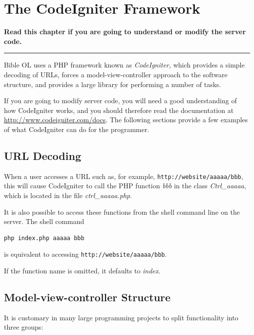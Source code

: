 \documentclass[11pt,oneside,a4paper]{memoir}
\begin{document}
\chapter{The CodeIgniter Framework}\label{chap-codeigniter-use}

\textbf{Read this chapter if you are going to understand or modify the server code.}
\plainbreak{3}

Bible OL uses a PHP framework known as \emph{CodeIgniter,} which provides a simple decoding of URLs,
forces a model-view-controller approach to the software structure, and provides a large library for
performing a number of tasks.

If you are going to modify server code, you will need a good understanding of how CodeIgniter works,
and you should therefore read the documentation at \url{http://www.codeigniter.com/docs}.
The following sections provide a few examples of what CodeIgniter can do for the programmer.

\section{URL Decoding}
\label{url-decoding}

When a user accesses a URL such as, for example, \texttt{http://website/aaaaa/bbb}, this will cause
CodeIgniter to call the PHP function \emph{bbb} in the class \emph{Ctrl\_aaaaa}, which is located in
the file \emph{ctrl\_aaaaa.php}.

It is also possible to access these functions from the shell command line on the server. The shell command

\begin{lstlisting}[language=bash]
php index.php aaaaa bbb
\end{lstlisting}

\noindent
is equivalent to accessing \texttt{http://website/aaaaa/bbb}.

If the function name is omitted, it defaults to \emph{index}.


\section{Model-view-controller Structure}

It is customary in many large programming projects to split functionality into three groups:
\end{document}
